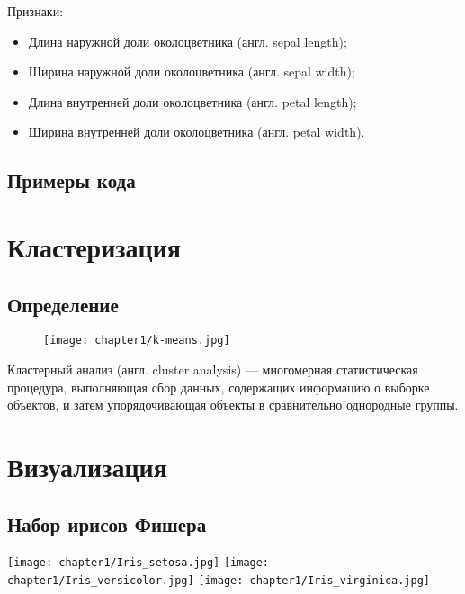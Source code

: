 Признаки:
\begin{itemize}
    \item Длина наружной доли околоцветника (англ. sepal length);
    \item Ширина наружной доли околоцветника (англ. sepal width);
    \item Длина внутренней доли околоцветника (англ. petal length);
    \item Ширина внутренней доли околоцветника (англ. petal width).
\end{itemize}

\subsection{Примеры кода}

\section{Кластеризация}
\subsection{Определение}

\begin{wrapfigure}{l}{0.33\textwidth}
    \vspace{-0.5cm}
    \texttt{[image: chapter1/k-means.jpg]}
\end{wrapfigure}
Кластерный анализ (англ. cluster analysis) — многомерная статистическая процедура, выполняющая сбор данных, содержащих информацию о выборке объектов, и затем упорядочивающая объекты в сравнительно однородные группы.\cite{wiki:clustering_def}

\section{Визуализация}
\subsection{Набор ирисов Фишера}

\begin{multicols}{3}
	
\texttt{[image: chapter1/Iris\_setosa.jpg]} %
\texttt{[image: chapter1/Iris\_versicolor.jpg]} %
\texttt{[image: chapter1/Iris\_virginica.jpg]} %
\end{multicols}
    
